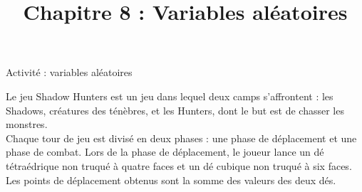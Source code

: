 \documentclass[11pt]{article}
\title{Chapitre 8 : Variables aléatoires}
\date{}
\author{}
\begin{document}

\begin{center}
  \Large Activité : variables aléatoires
\end{center}

Le jeu Shadow Hunters est un jeu dans lequel deux camps s'affrontent : les
Shadows, créatures des ténèbres, et les Hunters, dont le but est de chasser les
monstres.\\
Chaque tour de jeu est divisé en deux phases : une phase de déplacement et une
phase de combat. Lors de la phase de déplacement, le joueur lance un dé
tétraédrique non truqué à quatre faces et un dé cubique non truqué à six faces.
Les points de déplacement obtenus sont la somme des valeurs des deux dés.
\end{document}
